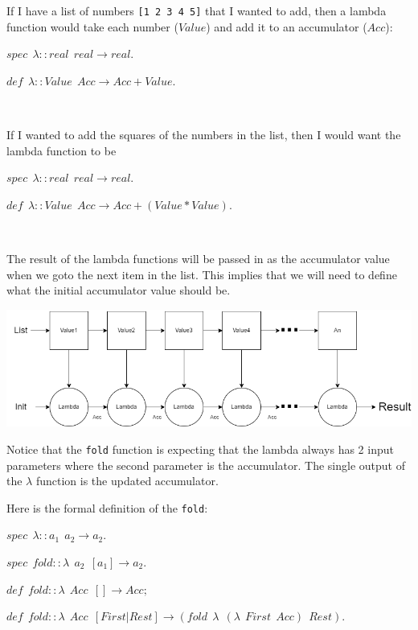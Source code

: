 \documentclass[
]{book}
\begin{document}
If I have a list of numbers \texttt{{[}1\ 2\ 3\ 4\ 5{]}} that I wanted to add, then a lambda function would take each number (\(Value\)) and add it to an accumulator (\(Acc\)):

\begin{formulabox}
\(spec ~ ~ \lambda :: real ~ ~ real \rightarrow real.\)

\(de\mathit{f} ~ ~ \lambda :: Value ~ ~ Acc \rightarrow Acc + Value.\)

\end{formulabox}

\(\nonumber\)

If I wanted to add the squares of the numbers in the list, then I would want the lambda function to be

\begin{formulabox}
\(spec ~ ~ \lambda :: real ~ ~ real \rightarrow real.\)

\(de\mathit{f} ~ ~ \lambda :: Value ~ ~ Acc \rightarrow Acc + (Value * Value).\)

\end{formulabox}

\(\nonumber\)

The result of the lambda functions will be passed in as the accumulator value when we goto the next item in the list. This implies that we will need to define what the initial accumulator value should be.

\includegraphics{images/fold.drawio.png}

Notice that the \texttt{fold} function is expecting that the lambda always has 2 input parameters where the second parameter is the accumulator. The single output of the \(\lambda\) function is the updated accumulator.

Here is the formal definition of the \texttt{fold}:

\begin{formulabox}
\(spec ~ ~ \lambda :: a_1 ~ ~ a_2 \rightarrow a_2.\)

\(spec ~ ~ \mathit{fold} :: \lambda ~ ~ a_2 ~ ~ [a_1]\rightarrow a_2.\)

\(de\mathit{f} ~ ~ \mathit{fold} :: \lambda ~ ~ Acc ~ ~ []\rightarrow Acc;\)

\(de\mathit{f} ~ ~ \mathit{fold} :: \lambda ~ ~ Acc ~ ~ [First|Rest] \rightarrow (\mathit{fold} ~ ~ \lambda ~ ~ (\lambda ~ ~ First ~ ~ Acc) ~ ~ Rest).\)

\end{formulabox}
\end{document}
